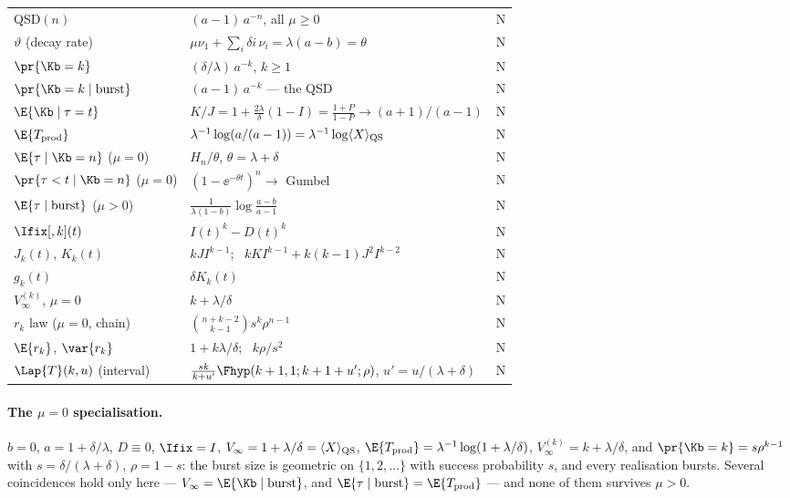\begin{longtable}{@{}p{}p{}c@{}}
QSD$(n)$ & $(a-1)\,a^{-n}$, all $\mu\ge0$ & N \\
$\vartheta$ (decay rate) & $\mu\nu_1+\sum_i\delta i\,\nu_i=\lambda(a-b)=\theta$ & N \\
$\pr{\Kb=k}$ & $(\delta/\lambda)\,a^{-k}$, $k\ge1$ & N \\
$\pr{\Kb=k\mid\text{burst}}$ & $(a-1)\,a^{-k}$ --- the QSD & N \\
$\E{\Kb\mid\tau=t}$ & $K/J=1+\frac{2\lambda}{\delta}(1-I)=\frac{1+P}{1-P}\to(a{+}1)/(a{-}1)$ & N \\
$\E{T_{\rm prod}}$ & $\lambda^{-1}\log(a/(a-1))=\lambda^{-1}\log\langle X\rangle_{\rm QS}$ & N \\
$\E{\tau\mid\Kb=n}$ ($\mu=0$) & $H_n/\theta$, $\theta=\lambda+\delta$ & N \\
$\pr{\tau<t\mid\Kb=n}$ ($\mu=0$) & $(1-\ee^{-\theta t})^n\to$ Gumbel & N \\
$\E{\tau\mid\text{burst}}$ ($\mu>0$) & $\frac{1}{\lambda(1-b)}\log\frac{a-b}{a-1}$ & N \\
$\Ifix[,{k}](t)$ & $I(t)^k-D(t)^k$ & N \\
$J_k(t)$, $K_k(t)$ & $kJI^{k-1}$; \ $kKI^{k-1}+k(k-1)J^2I^{k-2}$ & N \\
$g_k(t)$ & $\delta K_k(t)$ & N \\
$V_\infty^{(k)}$, $\mu=0$ & $k+\lambda/\delta$ & N \\
$r_k$ law ($\mu=0$, chain) & $\binom{n+k-2}{k-1}s^k\rho^{n-1}$ & N \\
$\E{r_k}$, $\var{r_k}$ & $1+k\lambda/\delta$; \ $k\rho/s^2$ & N \\
$\Lap{T}(k,u)$ (interval) & $\frac{sk}{k+u'}\Fhyp(k+1,1;k+1+u';\rho)$, $u'=u/(\lambda+\delta)$ & N \\
\end{longtable}
\endgroup

\paragraph{The $\mu=0$ specialisation.} $b=0$, $a=1+\delta/\lambda$,
$D\equiv0$, $\Ifix=I$,
$V_\infty=1+\lambda/\delta=\langle X\rangle_{\rm QS}$,
$\E{T_{\rm prod}}=\lambda^{-1}\log(1+\lambda/\delta)$,
$V_\infty^{(k)}=k+\lambda/\delta$, and
$\pr{\Kb=k}=s\rho^{k-1}$ with $s=\delta/(\lambda+\delta)$, $\rho=1-s$: the
burst size is geometric on $\{1,2,\ldots\}$ with success probability $s$, and
every realisation bursts. Several coincidences hold only here ---
$V_\infty=\E{\Kb\mid\text{burst}}$, and
$\E{\tau\mid\text{burst}}=\E{T_{\rm prod}}$ --- and none of them survives
$\mu>0$.
